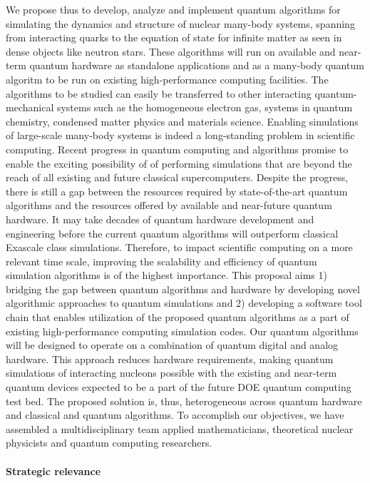 \documentclass[10pt]{article}
\begin{document}
We propose thus to develop, analyze and implement quantum algorithms for simulating the dynamics and structure of nuclear many-body systems, spanning from interacting quarks to the equation of state for infinite matter as seen in dense objects like neutron stars. These algorithms will run on available and near-term quantum hardware as standalone applications and as a many-body quantum algoritm to be run on existing high-performance computing facilities. The algorithms to be studied can easily be transferred to other interacting quantum-mechanical systems such as the homogeneous electron gas, systems in quantum chemistry, condensed matter physics and materials science.  
Enabling simulations of large-scale many-body systems is indeed a long-standing problem in scientific computing. Recent progress in quantum computing and algorithms promise to enable the exciting possibility of of performing simulations that are beyond the reach of all existing and future classical supercomputers. Despite the progress, there is still a gap between the
resources required by state-of-the-art quantum algorithms and the resources offered by available and near-future
quantum hardware. It may take decades of quantum hardware development and engineering before
the current quantum algorithms will outperform classical Exascale class simulations. Therefore, to impact
scientific computing on a more relevant time scale, improving the scalability and efficiency of
quantum simulation algorithms is of the highest importance. This proposal aims 1) bridging
the gap between quantum algorithms  and hardware by developing novel algorithmic approaches to quantum
simulations and 2) developing a software tool chain that enables utilization of the proposed quantum algorithms as a
part of  existing high-performance computing simulation codes. Our quantum algorithms will be  designed to operate on a combination of quantum digital and analog
hardware. This approach reduces hardware requirements, making quantum simulations of interacting
nucleons possible with the existing and near-term quantum devices expected to be a part of
the future DOE quantum computing test bed. The proposed solution is, thus, heterogeneous across
quantum hardware and classical and quantum algorithms.
To accomplish our objectives, we have assembled a multidisciplinary team
applied mathematicians, theoretical nuclear physicists  and quantum computing
researchers.


\paragraph{Strategic relevance}
\end{document}
